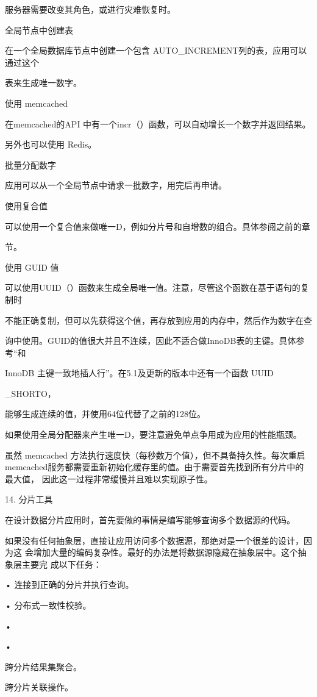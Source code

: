 服务器需要改变其角色，或进行灾难恢复时。

全局节点中创建表

在一个全局数据库节点中创建一个包含 AUTO\_INCREMENT列的表，应用可以通过这个

表来生成唯一数字。

使用 memcached

在memcached的API 中有一个incr（）函数，可以自动增长一个数字并返回结果。

另外也可以使用 Redis。

批量分配数字

应用可以从一个全局节点中请求一批数字，用完后再申请。

使用复合值

可以使用一个复合值来做唯一D，例如分片号和自增数的组合。具体参阅之前的章

节。

使用 GUID 值

可以使用UUID（）函数来生成全局唯一值。注意，尽管这个函数在基于语句的复制时

不能正确复制，但可以先获得这个值，再存放到应用的内存中，然后作为数字在查

询中使用。GUID的值很大并且不连续，因此不适合做InnoDB表的主键。具体参考“和

InnoDB 主键一致地插人行”。在5.1及更新的版本中还有一个函数 UUID

\_SHORTO，

能够生成连续的值，并使用64位代替了之前的128位。

如果使用全局分配器来产生唯一D，要注意避免单点争用成为应用的性能瓶颈。

虽然 memcached 方法执行速度快（每秒数万个值），但不具备持久性。每次重启
memcached服务都需要重新初始化缓存里的值。由于需要首先找到所有分片中的最大值，
因此这一过程非常缓慢并且难以实现原子性。

14. 分片工具

在设计数据分片应用时，首先要做的事情是编写能够查询多个数据源的代码。

如果没有任何抽象层，直接让应用访问多个数据源，那绝对是一个很差的设计，因为这
会增加大量的编码复杂性。最好的办法是将数据源隐藏在抽象层中。这个抽象层主要完
成以下任务：

• 连接到正确的分片并执行查询。

• 分布式一致性校验。

•

•

跨分片结果集聚合。

跨分片关联操作。

